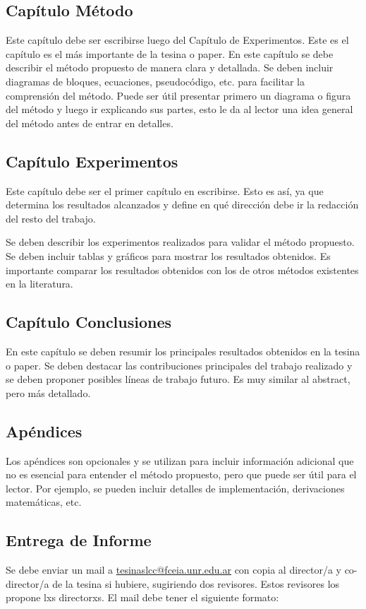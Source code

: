 \documentclass[a4paper,	11pt]{article}
\begin{document}
\subsection{Capítulo Método}
%
Este capítulo debe ser escribirse luego del Capítulo de Experimentos. 
Este es el capítulo es el más importante de la tesina o paper. En este capítulo se debe describir el método propuesto de manera clara y detallada. Se deben incluir diagramas de bloques, ecuaciones, pseudocódigo, etc. para facilitar la comprensión del método. Puede ser útil presentar primero un diagrama o figura del método y luego ir explicando sus partes, esto le da al lector una idea general del método antes de entrar en detalles.

\subsection{Capítulo Experimentos}
Este capítulo debe ser el primer capítulo en escribirse. Esto es así, ya que determina los resultados alcanzados y define en qué dirección debe ir la redacción del resto del trabajo.

Se deben describir los experimentos realizados para validar el método propuesto. Se deben incluir tablas y gráficos para mostrar los resultados obtenidos. Es importante comparar los resultados obtenidos con los de otros métodos existentes en la literatura.

\subsection{Capítulo Conclusiones}
En este capítulo se deben resumir los principales resultados obtenidos en la tesina o paper. Se deben destacar las contribuciones principales del trabajo realizado y se deben proponer posibles líneas de trabajo futuro. Es muy similar al abstract, pero más detallado.

\subsection{Apéndices}
Los apéndices son opcionales y se utilizan para incluir información adicional que no es esencial para entender el método propuesto, pero que puede ser útil para el lector. Por ejemplo, se pueden incluir detalles de implementación, derivaciones matemáticas, etc.

\subsection{Entrega de Informe}
Se debe enviar un mail a \href{mailto:tesinaslcc@fceia.unr.edu.ar}{tesinaslcc@fceia.unr.edu.ar} con copia al director/a y co-director/a de la tesina si hubiere, sugiriendo dos revisores. Estos revisores los propone lxs directorxs. El mail debe tener el siguiente formato:
\end{document}

